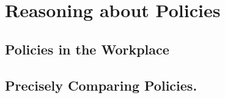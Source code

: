 \documentclass[thesis.tex]{subfiles}
\begin{document}
\chapter{Reasoning about Policies}
\label{chap:byod}

\section{Policies in the Workplace}

\section{Precisely Comparing Policies.}
\end{document}
